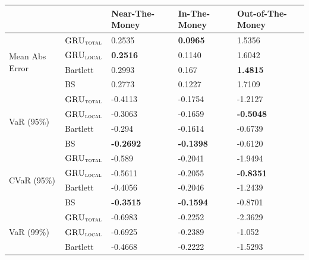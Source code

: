 \documentclass[letterpaper,12pt,titlepage,oneside,final]{book}
\numberwithin{equation}{section}
\theoremstyle{definition}
\newcommand{\modelT}{\textsc{GRU}_{\textsc{total}}}
\newcommand{\modelL}{\textsc{GRU}_{\textsc{local}}}
\begin{document}
\begin{table}[htp!]
	\centering
	\begin{tabular}{ll|l|l|l|}
		\cline{3-5}
		&          & Near-The-Money   & In-The-Money     & Out-of-The-Money  \\ \hline
		\multicolumn{1}{|l|}{\multirow{4}{*}{Mean Abs Error}} & $\modelT$    & 0.2535           & \textbf{0.0965}  & 1.5356   \\ 
		\multicolumn{1}{|l|}{}                                & $\modelL$    & \textbf{0.2516}  & 0.1140           & 1.6042             \\ 
		\multicolumn{1}{|l|}{}                                & Bartlett     & 0.2993 			& 0.167  		   & \textbf{1.4815}       \\ 
		\multicolumn{1}{|l|}{}                                & BS       	 & 0.2773 		    & 0.1227 		   & 1.7109            \\ 
		\hline
		\multicolumn{1}{|l|}{\multirow{4}{*}{VaR (95\%)}}     & $\modelT$    &-0.4113 &-0.1754 &-1.2127  \\ 
		\multicolumn{1}{|l|}{}                                & $\modelL$    &-0.3063 &-0.1659 &\textbf{-0.5048}           \\ 
		\multicolumn{1}{|l|}{}                                & Bartlett 	 &-0.294  &-0.1614 &-0.6739           \\  
		\multicolumn{1}{|l|}{}                                & BS       	 &\textbf{-0.2692} &\textbf{-0.1398} &-0.6120           \\ 
		\hline
		\multicolumn{1}{|l|}{\multirow{4}{*}{CVaR (95\%)}}    & $\modelT$    &-0.589  &-0.2041 &-1.9494 \\ 
		\multicolumn{1}{|l|}{}                                & $\modelL$    &-0.5611 &-0.2055 &\textbf{-0.8351}         \\  
		\multicolumn{1}{|l|}{}                                & Bartlett 	 &-0.4056 &-0.2046 &-1.2439          \\  
		\multicolumn{1}{|l|}{}                                & BS       	 &\textbf{-0.3515} &\textbf{-0.1594} &-0.8701          \\ 
		\hline
		\multicolumn{1}{|l|}{\multirow{4}{*}{VaR (99\%)}}     & $\modelT$    &-0.6983 &-0.2252 &-2.3629 \\  
		\multicolumn{1}{|l|}{}                                & $\modelL$    &-0.6925 &-0.2389 &-1.052           \\ 
		\multicolumn{1}{|l|}{}                                & Bartlett 	 &-0.4668 &-0.2222 &-1.5293         \\  

\end{tabular}
\end{table}
\end{document}
